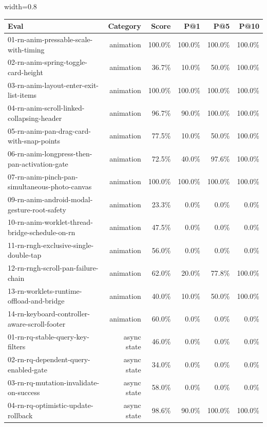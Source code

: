 \begin{table}[htbp]
\centering
\begin{adjustbox}{width=0.8\textwidth}
\begin{tabular}{lrrrrr}
\toprule
Eval & Category & Score & P@1 & P@5 & P@10 \\
\midrule
01-rn-anim-pressable-scale-with-timing & animation & 100.0\% & 100.0\% & 100.0\% & 100.0\% \\
02-rn-anim-spring-toggle-card-height & animation & 36.7\% & 10.0\% & 50.0\% & 100.0\% \\
03-rn-anim-layout-enter-exit-list-items & animation & 100.0\% & 100.0\% & 100.0\% & 100.0\% \\
04-rn-anim-scroll-linked-collapsing-header & animation & 96.7\% & 90.0\% & 100.0\% & 100.0\% \\
05-rn-anim-pan-drag-card-with-snap-points & animation & 77.5\% & 10.0\% & 50.0\% & 100.0\% \\
06-rn-anim-longpress-then-pan-activation-gate & animation & 72.5\% & 40.0\% & 97.6\% & 100.0\% \\
07-rn-anim-pinch-pan-simultaneous-photo-canvas & animation & 100.0\% & 100.0\% & 100.0\% & 100.0\% \\
09-rn-anim-android-modal-gesture-root-safety & animation & 23.3\% & 0.0\% & 0.0\% & 0.0\% \\
10-rn-anim-worklet-thread-bridge-schedule-on-rn & animation & 47.5\% & 0.0\% & 0.0\% & 0.0\% \\
11-rn-rngh-exclusive-single-double-tap & animation & 56.0\% & 0.0\% & 0.0\% & 0.0\% \\
12-rn-rngh-scroll-pan-failure-chain & animation & 62.0\% & 20.0\% & 77.8\% & 100.0\% \\
13-rn-worklets-runtime-offload-and-bridge & animation & 40.0\% & 10.0\% & 50.0\% & 100.0\% \\
14-rn-keyboard-controller-aware-scroll-footer & animation & 60.0\% & 0.0\% & 0.0\% & 0.0\% \\
01-rn-rq-stable-query-key-filters & async state & 46.0\% & 0.0\% & 0.0\% & 0.0\% \\
02-rn-rq-dependent-query-enabled-gate & async state & 34.0\% & 0.0\% & 0.0\% & 0.0\% \\
03-rn-rq-mutation-invalidate-on-success & async state & 58.0\% & 0.0\% & 0.0\% & 0.0\% \\
04-rn-rq-optimistic-update-rollback & async state & 98.6\% & 90.0\% & 100.0\% & 100.0\% \\

\end{tabular}
\end{adjustbox}
\end{table}
